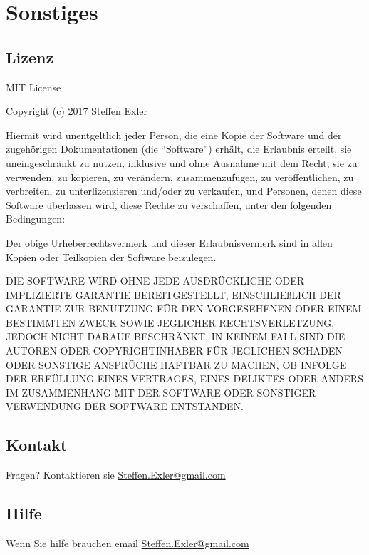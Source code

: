\documentclass[letterpaper,10pt,ngerman]{sphinxmanual}
\begin{document}
\chapter{Sonstiges}
\label{\detokenize{index:sonstiges}}

\section{Lizenz}
\label{\detokenize{license::doc}}\label{\detokenize{license:lizenz}}
MIT License

Copyright (c) 2017 Steffen Exler

Hiermit wird unentgeltlich jeder Person, die eine Kopie der Software und der zugehörigen Dokumentationen (die ``Software'') erhält, die Erlaubnis erteilt, sie uneingeschränkt zu nutzen, inklusive und ohne Ausnahme mit dem Recht, sie zu verwenden, zu kopieren, zu verändern, zusammenzufügen, zu veröffentlichen, zu verbreiten, zu unterlizenzieren und/oder zu verkaufen, und Personen, denen diese Software überlassen wird, diese Rechte zu verschaffen, unter den folgenden Bedingungen:

Der obige Urheberrechtsvermerk und dieser Erlaubnisvermerk sind in allen Kopien oder Teilkopien der Software beizulegen.

DIE SOFTWARE WIRD OHNE JEDE AUSDRÜCKLICHE ODER IMPLIZIERTE GARANTIE BEREITGESTELLT, EINSCHLIEßLICH DER GARANTIE ZUR BENUTZUNG FÜR DEN VORGESEHENEN ODER EINEM BESTIMMTEN ZWECK SOWIE JEGLICHER RECHTSVERLETZUNG, JEDOCH NICHT DARAUF BESCHRÄNKT. IN KEINEM FALL SIND DIE AUTOREN ODER COPYRIGHTINHABER FÜR JEGLICHEN SCHADEN ODER SONSTIGE ANSPRÜCHE HAFTBAR ZU MACHEN, OB INFOLGE DER ERFÜLLUNG EINES VERTRAGES, EINES DELIKTES ODER ANDERS IM ZUSAMMENHANG MIT DER SOFTWARE ODER SONSTIGER VERWENDUNG DER SOFTWARE ENTSTANDEN.


\section{Kontakt}
\label{\detokenize{license:kontakt}}
Fragen? Kontaktieren sie \href{mailto:Steffen.Exler@gmail.com}{Steffen.Exler@gmail.com}


\section{Hilfe}
\label{\detokenize{help::doc}}\label{\detokenize{help:hilfe}}
Wenn Sie hilfe brauchen email \href{mailto:Steffen.Exler@gmail.com}{Steffen.Exler@gmail.com}
\end{document}
